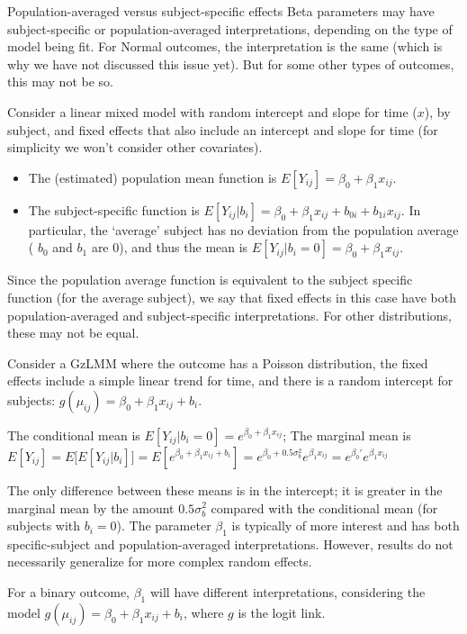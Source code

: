 \documentclass[
  9pt,
  ignorenonframetext,
]{beamer}
\begin{document}
\begin{frame}{Population-averaged versus subject-specific effects}
\protect\hypertarget{population-averaged-versus-subject-specific-effects}{}
Beta parameters may have subject-specific or population-averaged
interpretations, depending on the type of model being fit. For Normal
outcomes, the interpretation is the same (which is why we have not
discussed this issue yet). But for some other types of outcomes, this
may not be so.

Consider a linear mixed model with random intercept and slope for time
(\(x\)), by subject, and fixed effects that also include an intercept
and slope for time (for simplicity we won't consider other covariates).

\begin{itemize}
\item
  The (estimated) population mean function is
  \(E[Y_{ij}]= \beta_0+ \beta_1 x_{ij}\).
\item
  The subject-specific function is
  \(E[Y_{ij} |b_i]= \beta_0+ \beta_1 x_{ij}+b_{0i}+b_{1i} x_{ij}\). In
  particular, the `average' subject has no deviation from the population
  average ( \(b_0\) and \(b_1\) are 0), and thus the mean is
  \(E[Y_{ij} |b_i=0]= \beta_0+ \beta_1 x_{ij}\).
\end{itemize}

Since the population average function is equivalent to the subject
specific function (for the average subject), we say that fixed effects
in this case have both population-averaged and subject-specific
interpretations. For other distributions, these may not be equal.
\end{frame}

\begin{frame}{}
\protect\hypertarget{section-15}{}
Consider a GzLMM where the outcome has a Poisson distribution, the fixed
effects include a simple linear trend for time, and there is a random
intercept for subjects: \(g(\mu_{ij}) = \beta_0+ \beta_1 x_{ij}+b_i\).

The conditional mean is
\(E[Y_{ij} |b_i=0]=e^{\beta_0+ \beta_1 x_{ij}}\); The marginal mean is
\(E[Y_{ij}]=E\big[E[Y_{ij}|b_i]\big]=E[e^{\beta_0+ \beta_1 x_{ij}+b_i}]=e^{\beta_0+0.5 \sigma_b^2} e^{\beta_1 x_{ij}}=e^{ \beta_0'} e^{\beta_1 x_{ij}}\)

The only difference between these means is in the intercept; it is
greater in the marginal mean by the amount \(0.5 \sigma_b^2\) compared
with the conditional mean (for subjects with \(b_i=0\)). The parameter
\(\beta_1\) is typically of more interest and has both specific-subject
and population-averaged interpretations. However, results do not
necessarily generalize for more complex random effects.

For a binary outcome, \(\beta_1\) will have different interpretations,
considering the model \(g(\mu_{ij}) = \beta_0+ \beta_1 x_{ij}+b_i\),
where \(g\) is the logit link.
\end{frame}
\end{document}

